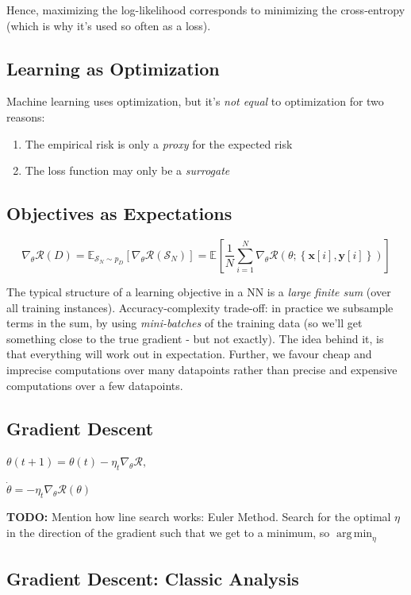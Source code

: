 \documentclass[a2paper,4pt]{extarticle}
\newcommand{\cR}{\mathcal{R}}
\newcommand{\cS}{\mathcal{S}}
\newcommand{\set}[1]{\left\{ #1 \right\}}
\newcommand{\Exp}[2][]{{\mathbb{E}_{#1}}\left[ #2
\right]}
\DeclareMathOperator*{\argmin}{arg\,min}
\renewcommand{\vec}[1]{\mathbf{#1}}
\newcommand{\vx}{\vec{x}}
\newcommand{\vy}{\vec{y}}
\newcommand{\todo}[1]{\textbf{TODO:} #1}
\newcommand{\todo}[1]{%
}
\begin{document}
\begin{landscape}
\begin{multicols*}{7}
Hence, maximizing the log-likelihood corresponds to minimizing the cross-entropy
(which is why it's used so often as a loss).

\subsection{Learning as Optimization}

Machine learning uses optimization, but it's \emph{not equal} to optimization
for two reasons:
\begin{enumerate}
  \item The empirical risk is only a \emph{proxy} for the expected risk
  \item The loss function may only be a \emph{surrogate}
\end{enumerate}

\subsection{Objectives as Expectations}

\[
\nabla_{\theta}\cR(D)
=
\Exp[\cS_N\sim p_D]{\nabla_{\theta}\cR(\cS_N)}
=
\Exp{
\frac{1}{N}
\sum_{i=1}^N
\nabla_{\theta}\cR(\theta;\set{\vx[i],\vy[i]})
}
\]

The typical structure of a learning objective in a NN is a \emph{large finite
sum} (over all training instances). Accuracy-complexity trade-off: in practice
we subsample terms in the sum, by using \emph{mini-batches} of the training data 
(so we'll get something close to the true gradient - but not exactly). The idea
behind it, is that everything will work out in expectation. Further, we favour
cheap and imprecise computations over many datapoints rather than precise and
expensive computations over a few datapoints.

\subsection{Gradient Descent}

$
\theta(t+1)=\theta(t)-\eta_t\nabla_\theta\cR,
$

$
\dot{\theta}=-\eta_t\nabla_\theta\cR(\theta)
$

\todo{Mention how line search works: Euler Method. Search for the optimal
$\eta$ in the direction of the gradient such that we get to a minimum, so
$\argmin_\eta$}

\subsection{Gradient Descent: Classic Analysis}


\end{multicols*}
\end{landscape}
\end{document}
